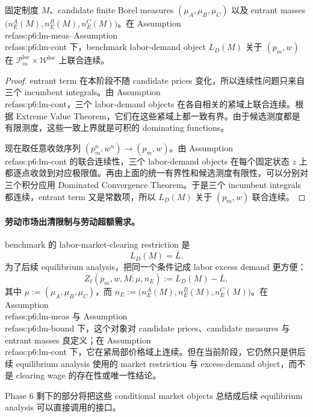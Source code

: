 \begin{proposition}[紧局部价格域上的连续性]
固定制度 $M$、candidate finite Borel measures $(\mu_A,\mu_B,\mu_C)$ 以及 entrant masses $\bigl(n_E^A(M),n_E^B(M),n_E^C(M)\bigr)$。在 Assumption~\\ref{ass:p6:lm-meas}--Assumption~\\ref{ass:p6:lm-cont} 下，benchmark labor-demand object $L_D(M)$ 关于 $(p_m,w)$ 在 $\mathcal P_m^{\mathrm{loc}}\times\mathcal W^{\mathrm{loc}}$ 上联合连续。
\end{proposition}

\begin{proof}
entrant term 在本阶段不随 candidate prices 变化，所以连续性问题只来自三个 incumbent integrals。由 Assumption~\\ref{ass:p6:lm-cont}，三个 labor-demand objects 在各自相关的紧域上联合连续。根据 Extreme Value Theorem，它们在这些紧域上都一致有界。由于候选测度都是有限测度，这些一致上界就是可积的 dominating functions。

现在取任意收敛序列 $(p_m^n,w^n)\to(p_m,w)$。由 Assumption~\\ref{ass:p6:lm-cont} 的联合连续性，三个 labor-demand objects 在每个固定状态 $z$ 上都逐点收敛到对应极限值。再由上面的统一有界性和候选测度有限性，可以分别对三个积分应用 Dominated Convergence Theorem。于是三个 incumbent integrals 都连续，entrant term 又是常数项，所以 $L_D(M)$ 关于 $(p_m,w)$ 联合连续。
\end{proof}

\paragraph{劳动市场出清限制与劳动超额需求。}
benchmark 的 labor-market-clearing restriction 是
\[
L_D(M)=\bar L.
\]
为了后续 equilibrium analysis，把同一个条件记成 labor excess demand 更方便：
\[
Z_\ell(p_m,w,M;\mu,n_E):=L_D(M)-\bar L,
\]
其中 $\mu:=(\mu_A,\mu_B,\mu_C)$，而 $n_E:=\bigl(n_E^A(M),n_E^B(M),n_E^C(M)\bigr)$。在 Assumption~\\ref{ass:p6:lm-meas} 与 Assumption~\\ref{ass:p6:lm-bound} 下，这个对象对 candidate prices、candidate measures 与 entrant masses 良定义；在 Assumption~\\ref{ass:p6:lm-cont} 下，它在紧局部价格域上连续。但在当前阶段，它仍然只是供后续 equilibrium analysis 使用的 market restriction 与 excess-demand object，而不是 clearing wage 的存在性或唯一性结论。

Phase 6 剩下的部分将把这些 conditional market objects 总结成后续 equilibrium analysis 可以直接调用的接口。

